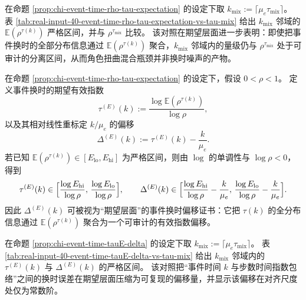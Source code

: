 \begin{remark}
\label{cor:chi-event-time-rho-tau-expectation-vs-tau-mix}
在命题 \ref{prop:chi-event-time-rho-tau-expectation} 的设定下取 $k_{\mathrm{mix}}:=\lceil\mu_e\tau_{\mathrm{mix}}\rceil$。
表 \ref{tab:real-input-40-event-time-rho-tau-expectation-vs-tau-mix} 给出 $k_{\mathrm{mix}}$ 邻域的 $\mathbb{E}(\rho^{\tau(k)})$ 严格区间，并与 $\rho^{\tau_{\mathrm{mix}}}$ 比较。
该对照在期望层面进一步表明：即使把事件换时的全部分布信息通过 $\mathbb{E}(\rho^{\tau(k)})$ 聚合，$k_{\mathrm{mix}}$ 邻域内的量级仍与 $\rho^{\tau_{\mathrm{mix}}}$ 处于可审计的分离区间，从而角色扭曲混合瓶颈并非换时噪声的产物。
\end{remark}



\begin{remark}
\label{prop:chi-event-time-tauE-delta}
在命题 \ref{prop:chi-event-time-rho-tau-expectation} 的设定下，假设 $0<\rho<1$。
定义事件换时的期望有效指数
$$
\tau^{(E)}(k):=\frac{\log\mathbb{E}(\rho^{\tau(k)})}{\log\rho},
$$
以及其相对线性重标定 $k/\mu_e$ 的偏移
$$
\Delta^{(E)}(k):=\tau^{(E)}(k)-\frac{k}{\mu_e}.
$$
若已知 $\mathbb{E}(\rho^{\tau(k)})\in[E_{\mathrm{lo}},E_{\mathrm{hi}}]$ 为严格区间，则由 $\log$ 的单调性与 $\log\rho<0$，得到
$$
\tau^{(E)}(k)\in\Bigl[\frac{\log E_{\mathrm{hi}}}{\log\rho},\,\frac{\log E_{\mathrm{lo}}}{\log\rho}\Bigr],
\qquad
\Delta^{(E)}(k)\in\Bigl[\frac{\log E_{\mathrm{hi}}}{\log\rho}-\frac{k}{\mu_e},\,\frac{\log E_{\mathrm{lo}}}{\log\rho}-\frac{k}{\mu_e}\Bigr].
$$
因此 $\Delta^{(E)}(k)$ 可被视为“期望层面”的事件换时偏移证书：它把 $\tau(k)$ 的全分布信息通过 $\mathbb{E}(\rho^{\tau(k)})$ 聚合为一个可审计的有效指数偏移。
\end{remark}

\begin{remark}
\label{cor:chi-event-time-tauE-delta-vs-tau-mix}
在命题 \ref{prop:chi-event-time-tauE-delta} 的设定下取 $k_{\mathrm{mix}}:=\lceil\mu_e\tau_{\mathrm{mix}}\rceil$。
表 \ref{tab:real-input-40-event-time-tauE-delta-vs-tau-mix} 给出 $k_{\mathrm{mix}}$ 邻域内的 $\tau^{(E)}(k)$ 与 $\Delta^{(E)}(k)$ 的严格区间。
该对照把“事件时间 $k$ 与步数时间指数包络”之间的换时误差在期望层面压缩为可复现的偏移量，并显示该偏移在对齐尺度处仅为常数阶。
\end{remark}



